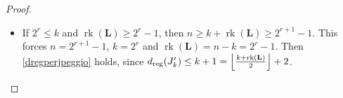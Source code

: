 \documentclass[11pt]{article}
\newcommand{\es}[2]{e_{#1,\, #2}}
\DeclarePairedDelimiter{\fl}{\lfloor}{\rfloor}
\theoremstyle{plain}
\theoremstyle{definition}
\theoremstyle{remark}
\begin{document}
\begin{proof}
\begin{itemize}
\begin{itemize}
\item If $k+\operatorname{rk}(\mathbf{L})=2^{r+1}-1$, then the last meaningful step happens for $\bar s=2^r-2-\operatorname{rk}(\mathbf{L})=k-2^r-1$.
In this case, $\es{2^r+1}{2^r-1}\in J_k'$, hence
\begin{align*}
    x_{2^r+1}x_{2^r}&\cdot\es{2^r+1}{2^r-1}
    =x_{2^r+1}x_{2^r}(\es{2^r}{2^r-1}+x_{2^r+1}\es{2^r}{2^r-2})=\\
    &=x_{2^r+1}x_{2^r}(\es{2^r-1}{2^r-1}+x_{2^r}\es{2^r-1}{2^r-2}+x_{2^r+1}\es{2^r}{2^r-2})=\\
    &=x_{2^r+1}x_{2^r}\es{2^r-1}{2^r-1}+x_{2^r+1}x_{2^r}^2\es{2^r-1}{2^r-2}+x_{2^r+1}^2x_{2^r}\es{2^r}{2^r-2}=\\
    &=\es{2^r+1}{2^r+1}+x_{2^r+1}x_{2^r}^2\es{2^r-1}{2^r-2}+x_{2^r+1}^2x_{2^r}\es{2^r}{2^r-2}
\end{align*}
belongs to $J_k'$, and therefore $\es{2^r+1}{2^r+1}\in J_k'$. We obtain the bound
\begin{equation}\label{dregperjpeggio}
    d_{\operatorname{reg}}(J_k')\leq \fl*{\frac{k+\operatorname{rk}(\mathbf{L})}{2}}+2=2^r+1.
\end{equation}
Notice that this case only occurs when $n=2^{r+1}-1$ and $\operatorname{rk}(\mathbf{L})=n-k\leq 2^r-2\leq k-2$, which implies $k\geq 2^r+1$. 
\end{itemize}
\item If $2^r\leq k$ and $\operatorname{rk}(\mathbf{L})\geq 2^{r}-1$, then $n\geq k+\operatorname{rk}(\mathbf{L})\geq 2^{r+1}-1$. This forces $n=2^{r+1}-1$, $k=2^r$ and $\operatorname{rk}(\mathbf{L})=n-k=2^r-1$. Then \eqref{dregperjpeggio} holds, since $d_{\operatorname{reg}}(J_k')\leq k+1=\fl*{\frac{k+\operatorname{rk}(\mathbf{L})}{2}}+2$.
\end{itemize}
\end{proof}
\end{document}
